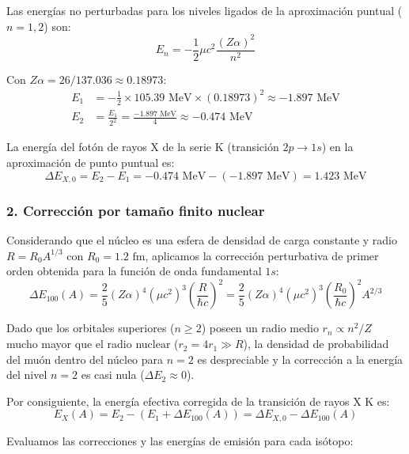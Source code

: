 \begin{problema}
Las energías no perturbadas para los niveles ligados de la aproximación puntual ($n = 1, 2$) son:
\begin{equation*}
E_n = -\frac{1}{2} \mu c^2 \frac{(Z \alpha)^2}{n^2}
\end{equation*}

Con $Z \alpha = 26 / 137.036 \approx 0.18973$:
\begin{align}
E_1 &= -\frac{1}{2} \times 105.39\text{ MeV} \times (0.18973)^2 \approx -1.897\text{ MeV} \\
E_2 &= \frac{E_1}{2^2} = \frac{-1.897\text{ MeV}}{4} \approx -0.474\text{ MeV}
\end{align}

La energía del fotón de rayos X de la serie K (transición $2p \to 1s$) en la aproximación de punto puntual es:
\begin{equation*}
\Delta E_{X,0} = E_2 - E_1 = -0.474\text{ MeV} - (-1.897\text{ MeV}) = 1.423\text{ MeV}
\end{equation*}

\subsubsection*{2. Corrección por tamaño finito nuclear}

Considerando que el núcleo es una esfera de densidad de carga constante y radio $R = R_0 A^{1/3}$ con $R_0 = 1.2\text{ fm}$, aplicamos la corrección perturbativa de primer orden obtenida para la función de onda fundamental $1s$:
\begin{equation*}
\Delta E_{100}(A) = \frac{2}{5} (Z \alpha)^4 (\mu c^2)^3 \left( \frac{R}{\hbar c} \right)^2 = \frac{2}{5} (Z \alpha)^4 (\mu c^2)^3 \left( \frac{R_0}{\hbar c} \right)^2 A^{2/3}
\end{equation*}

Dado que los orbitales superiores ($n \ge 2$) poseen un radio medio $r_n \propto n^2 / Z$ mucho mayor que el radio nuclear ($r_2 = 4 r_1 \gg R$), la densidad de probabilidad del muón dentro del núcleo para $n=2$ es despreciable y la corrección a la energía del nivel $n=2$ es casi nula ($\Delta E_2 \approx 0$).

Por consiguiente, la energía efectiva corregida de la transición de rayos X K es:
\begin{equation*}
E_X(A) = E_2 - (E_1 + \Delta E_{100}(A)) = \Delta E_{X,0} - \Delta E_{100}(A)
\end{equation*}

Evaluamos las correcciones y las energías de emisión para cada isótopo:


\end{problema}
